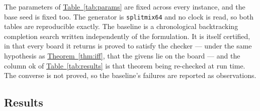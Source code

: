 \documentclass{easychair}
\newcommand{\thmref}[1]{\textcolor{academicpurple}{\hyperref[#1]{Theorem~\ref*{#1}}}}
\newcommand{\tabref}[1]{\textcolor{academicpurple}{\hyperref[#1]{Table~\ref*{#1}}}}
\begin{document}
The parameters of \tabref{tab:params} are fixed across every instance, and the base seed is fixed too.
The generator is \texttt{splitmix64} and no clock is read, so both tables are reproducible exactly.
The baseline is a chronological backtracking completion search written independently of the
formulation. It is itself certified, in that every board it returns is proved to satisfy the checker
--- under the same hypothesis as \thmref{thm:iff}, that the givens lie on the board ---
and the column \textsf{ok} of \tabref{tab:results} is that theorem being re-checked at run time. The
converse is not proved, so the baseline's failures are reported as observations.

\subsection{Results}\label{sec:results}
\end{document}
